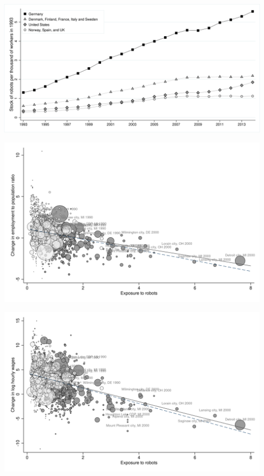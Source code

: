 \documentclass{article}
\begin{document}
\begin{center}\includegraphics[scale=0.15]{output/figure_robot_trends.png}\end{center}
\begin{center}\includegraphics[scale=0.15]{output/figure_stacked_emppriv.png}\end{center}
\begin{center}\includegraphics[scale=0.15]{output/figure_stacked_hrwage.png}\end{center}
\end{document}
